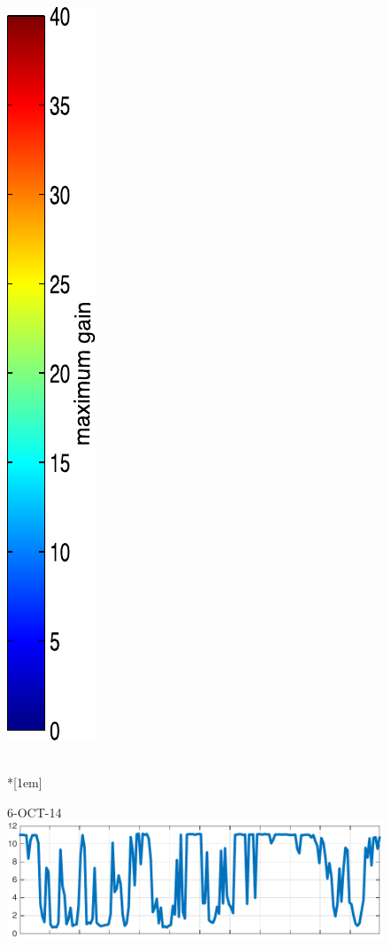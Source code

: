 \begin{figure}
\begin{minipage}[c]{\mylength}
\includegraphics[valign=t,trim=2pt -8pt 0 5pt,width=\colorbarwidth,totalheight=\eventheight]{events/colorbar-40.pdf}
\end{minipage}  \\*[1em]
\begin{minipage}[c]{\mylength}
\centering \scriptsize 6-OCT-14 \\
\includegraphics[valign=t,trim=0 0 5pt 0,angle=90,origin=tr,width=\sunintwidth,totalheight=\eventheight]{events/20141006-intensity.pdf}

\end{minipage}
\end{figure}
